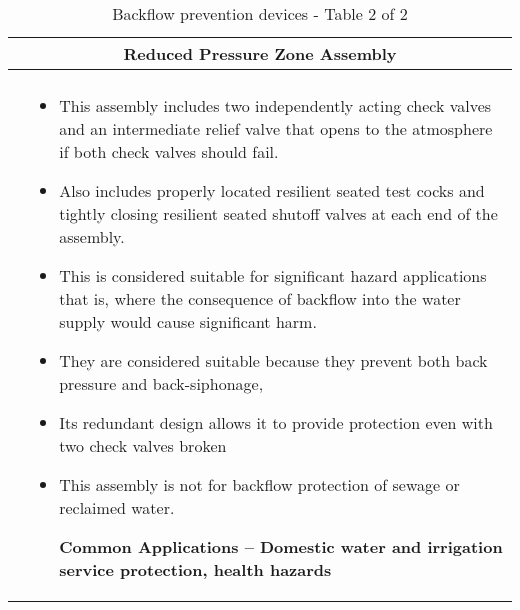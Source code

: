 \begin{landscape}
\begin{table}[h!]
\begin{tabular}{|c m{20cm} |}
\multicolumn{2}{c}{Reduced Pressure Zone Assembly} \index{Backflow!Prevention devices!Reduced pressure zone (RPZ)}\\ \hline
    \begin{minipage}{.3\textwidth}
    \hspace{0.3cm}
     \texttt{[image: ReducedPressurePrinciple1]}\\
    \end{minipage}
     &
    \vspace{0.8cm}
\scriptsize{\begin{itemize}[topsep=5pt, partopsep=0pt]
\item This assembly includes two independently acting check valves and an intermediate relief valve that opens to the atmosphere if both check valves should fail. \item Also includes properly located resilient seated test cocks and tightly closing resilient seated shutoff valves at each end of the assembly.

\item This is considered suitable for significant hazard applications that is, where the consequence of backflow into the water supply would cause significant harm.
\item They are considered suitable because they prevent both back pressure and back-siphonage, 
\item Its redundant design allows it to provide protection even with two check valves broken
\item  This assembly is not for backflow protection of sewage or reclaimed water.

\textbf{Common Applications – Domestic water and irrigation service protection, health hazards}
\end{itemize}}
\\ \hline
\end{tabular}
\caption{Backflow prevention devices - Table 2 of 2}  
                \label{table:Backflow2} 
\end{table}

\end{landscape}


